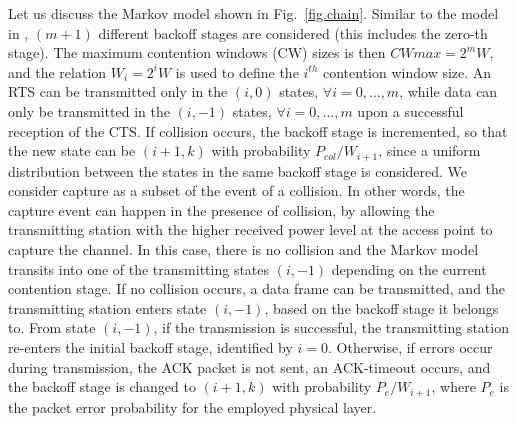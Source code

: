 \documentclass[10pt,onecolumn,a4paper]{IEEEtran}
\begin{document}
Let us discuss the Markov model shown in Fig.~\ref{fig.chain}.
Similar to the model in \cite{Bianchi}, $(m+1)$ different backoff
stages are considered (this includes the zero-th stage). The
maximum contention windows (CW) sizes is then $CWmax = 2^mW$,
and the relation $W_i = 2^iW$ is used to define the $i^{th}$
contention window size. An RTS can be transmitted only in the
$(i,0)$ states, $\forall i=0,\ldots,m$, while data can only be
transmitted in the $(i,-1)$ states, $\forall i=0,\ldots,m$ upon a
successful reception of the CTS. If collision occurs, the backoff
stage is incremented, so that the new state can be $(i+1,k)$ with
probability $P_{col}/W_{i+1}$, since a uniform distribution
between the states in the same backoff stage is considered. We
consider capture as a subset of the event of a collision. In other
words, the capture event can happen in the presence of collision,
by allowing the transmitting station with the higher received
power level at the access point to capture the channel. In this
case, there is no collision and the Markov model transits into one
of the transmitting states $(i,-1)$ depending on the current
contention stage. If no collision occurs, a data frame can be
transmitted, and the transmitting station enters state $(i,-1)$,
based on the backoff stage it belongs to. From state $(i,-1)$, if
the transmission is successful, the transmitting station re-enters
the initial backoff stage, identified by $i=0$. Otherwise, if
errors occur during transmission, the ACK packet is not sent, an
ACK-timeout occurs, and the backoff stage is changed to $(i+1,k)$
with probability $P_e/W_{i+1}$, where $P_e$ is the packet error
probability for the employed physical layer.
\end{document}
